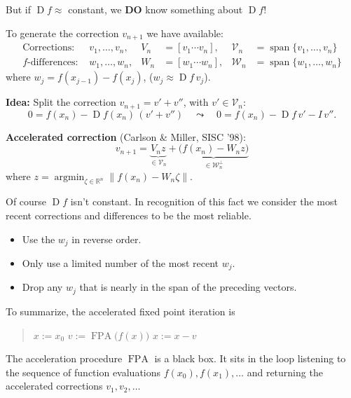 \documentclass[landscape,footrule,20pt]{foils}
\newcommand{\R}{\mathbb{R}}
\newcommand{\V}{\mathcal{V}}
\newcommand{\W}{\mathcal{W}}
\DeclareMathOperator{\Span}{span}
\DeclareMathOperator{\argmin}{argmin}
\newcommand{\norm}[1]{\lVert#1\rVert}
\DeclareMathOperator{\D}{D}
\newcommand{\Df}{\D\!\!f}
\newcommand{\DS}{\displaystyle}
\begin{document}
But if $\Df\approx$ constant, we \textbf{DO} know something about $\Df$!



To generate the correction $v_{n+1}$ we have available:
\begin{align*}
  \text{Corrections: }&
      v_1, \dots, v_n, &
      V_n &= [v_1 \cdots v_n], & 
      \V_n &= \Span\{v_1,\dots,v_n\} \\
  \text{$f$-differences: }&
      w_1, \dots, w_n, &
      W_n &= [w_1 \cdots w_n], & 
      \W_n &= \Span\{w_1,\dots,w_n\}
\end{align*}
where $w_j = f(x_{j-1}) - f(x_j)$, ($w_j \approx \Df\,v_j$).

\textbf{Idea:} Split the correction $v_{n+1} = v' + v''$, with $v'\in\V_n$:
\begin{equation*}
  0 = f(x_n) - \Df(x_n)\,(v'+v'') \quad\leadsto\quad
  0 = f(x_n) - \Df\,v' - I\,v''.
\end{equation*}

\textbf{Accelerated correction} (Carlson \& Miller, SISC '98):
\begin{equation*}
  v_{n+1} = \underbrace{V_n z}_{\DS\in\V_n} + 
    \underbrace{\bigl(f(x_n) - W_n z\bigr)}_{\DS\in\W_n^\perp}
\end{equation*}
where $z = \argmin_{\zeta\in\R^n} \norm{f(x_n) - W_n \zeta}$.


Of course $\Df$ isn't constant.  In recognition of this fact we consider
the most recent corrections and differences to be the most reliable.
\begin{itemize}
\item Use the $w_j$ in reverse order.
\item Only use a limited number of the most recent $w_j$.
\item Drop any $w_j$ that is nearly in the span of the preceding vectors.
\end{itemize}



To summarize, the accelerated fixed point iteration is
\begin{quote}\begin{algorithmic}
\STATE $x := x_0$
\REPEAT
  \STATE $v := \operatorname{FPA}\bigl(f(x)\bigr)$
    \quad{}
  \STATE $x := x - v$
\end{algorithmic}\end{quote}
The acceleration procedure $\operatorname{FPA}$ is a black box.
It sits in the loop listening to the sequence of function evaluations
$f(x_0), f(x_1), \ldots$ and returning the accelerated corrections
$v_1, v_2, \ldots$
\end{document}
